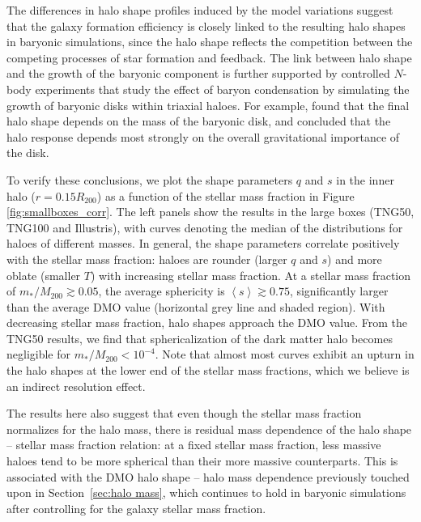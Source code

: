 \documentclass[fleqn,usenatbib]{mnras}
\begin{document}
The differences in halo shape profiles induced by the model variations suggest that the galaxy formation efficiency is closely linked to 
the resulting halo shapes in baryonic simulations, since the halo shape reflects the competition between the competing processes of star formation and feedback.
The link between halo shape and the growth of the baryonic component is further supported by  controlled $N$-body experiments that study the effect of baryon condensation by simulating the growth of baryonic disks within triaxial haloes.
For example, \cite{Debattista08v681} found that the final halo shape depends on the mass of the baryonic disk, and \cite{Kazantzidis10v720} concluded that the halo response depends most strongly on the overall gravitational importance of the disk.

To verify these conclusions, we plot the shape parameters $q$ and $s$  in the inner halo ($r = 0.15 R_{200}$) as a function of the stellar mass fraction in Figure \ref{fig:smallboxes_corr}.
The left panels show the results in the large boxes (TNG50, TNG100 and Illustris), with curves denoting the median of the distributions for haloes of different masses.
In general, the shape parameters correlate positively with the stellar mass fraction: 
haloes are rounder (larger $q$ and $s$) and more oblate (smaller $T$) with increasing stellar mass fraction.
At a stellar mass fraction of $m_*/M_{200} \gtrsim 0.05$, the average sphericity is  $\left<s\right> \gtrsim 0.75$, significantly larger than the average DMO value (horizontal grey line and shaded region). 
With decreasing stellar mass fraction, halo shapes approach the DMO value.
From the TNG50 results, we find that sphericalization of the dark matter halo becomes negligible for $m_*/M_{200} < 10^{-4}$.
Note that almost most curves exhibit an upturn in the halo shapes at the lower end of the stellar mass fractions, which we believe is an indirect resolution effect.


The results here also suggest that even though the stellar mass fraction normalizes for the halo mass, there is residual mass dependence of the halo shape -- stellar mass fraction relation: 
at a fixed stellar mass fraction, less massive haloes tend to be more spherical than their more massive counterparts.
This is associated with the DMO halo shape -- halo mass dependence previously touched upon in Section~\ref{sec:halo mass}, which continues to hold in baryonic simulations after controlling for the galaxy stellar mass fraction.
\end{document}
